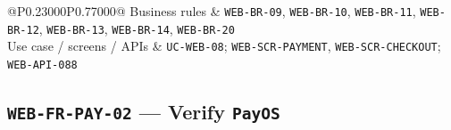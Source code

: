 \begin{longtable}{@{}P{0.23000\SRSWidth}P{0.77000\SRSWidth}@{}}
Business rules & \texttt{WEB-\allowbreak{}BR-\allowbreak{}09}, \texttt{WEB-\allowbreak{}BR-\allowbreak{}10}, \texttt{WEB-\allowbreak{}BR-\allowbreak{}11}, \texttt{WEB-\allowbreak{}BR-\allowbreak{}12}, \texttt{WEB-\allowbreak{}BR-\allowbreak{}13}, \texttt{WEB-\allowbreak{}BR-\allowbreak{}14}, \texttt{WEB-\allowbreak{}BR-\allowbreak{}20} \\[3pt]
Use case /\allowbreak{} screens /\allowbreak{} APIs & \texttt{UC-\allowbreak{}WEB-\allowbreak{}08}; \texttt{WEB-\allowbreak{}SCR-\allowbreak{}PAYMENT}, \texttt{WEB-\allowbreak{}SCR-\allowbreak{}CHECKOUT\allowbreak{}}; \texttt{WEB-\allowbreak{}API-\allowbreak{}088} \\[3pt]
\end{longtable}
\endgroup

\subsection{\texttt{WEB-\allowbreak{}FR-\allowbreak{}PAY-\allowbreak{}02} — Verify \texttt{Pay\allowbreak{}OS}}
\begingroup
\fontsize{9.5}{12}\selectfont
\setlength{\SRSWidth}{\dimexpr\linewidth-2\tabcolsep\relax}
